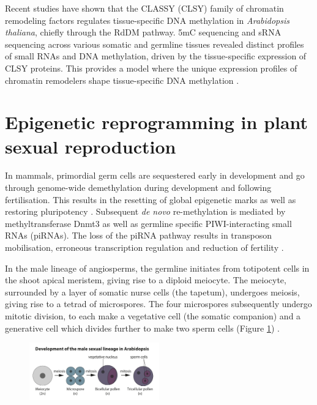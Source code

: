 Recent studies have shown that the CLASSY (CLSY) family of chromatin remodeling factors regulates tissue-specific DNA methylation in \textit{Arabidopsis thaliana}, chiefly through the RdDM pathway. 5mC sequencing and sRNA sequencing across various somatic and germline tissues revealed distinct profiles of small RNAs and DNA methylation, driven by the tissue-specific expression of CLSY proteins. This provides a model where the unique expression profiles of chromatin remodelers shape tissue-specific DNA methylation \citep{RN162}.  


\section{Epigenetic reprogramming in plant sexual reproduction}

In mammals, primordial germ cells are sequestered early in development and go through genome-wide demethylation during development and following fertilisation. This results in the resetting of global epigenetic marks as well as restoring pluripotency \citep{RN210}. Subsequent \textit{de novo} re-methylation is mediated by methyltransferase Dnmt3 as well as germline specific PIWI-interacting small RNAs (piRNAs). The loss of the piRNA pathway results in transposon mobilisation, erroneous transcription regulation and reduction of fertility \citep{RN124,RN125,RN126}.

In the male lineage of angiosperms, the germline initiates from totipotent cells in the shoot apical meristem, giving rise to a diploid meiocyte. The meiocyte, surrounded by a layer of somatic nurse cells (the tapetum), undergoes meiosis, giving rise to a tetrad of microspores. The four microspores subsequently undergo mitotic division, to each make a vegetative cell (the somatic companion) and a generative cell which divides further to make two sperm cells (Figure \ref{fig:male_sex_dev}) \citep{RN14,RN199}. 

\begin{figure}[htbp!] 
\centering    
    \includegraphics[width=0.5\textwidth]{Chapter1/Figs/male_sex_dev.pdf}
\caption{}
\label{fig:male_sex_dev}
\captionsetup{font=small}
    \caption*{\citep{RN199}}
\end{figure}

